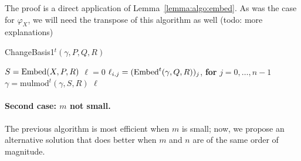 \documentclass[12pt]{article}
\def\mulmod {\ensuremath{\mathrm{mulmod}}}
\begin{document}
The proof is a direct application of Lemma~\ref{lemma:algo:embed}.  As
was the case for $\varphi_X$, we will need the transpose of this
algorithm as well (todo: more explanations)
\begin{algorithm}[H]
  \caption{ChangeBasis1$^t(\gamma,P,Q,R)$}
  \begin{algorithmic}[1]
    \STATE $S={\rm Embed}(X,P,R)$
    \STATE $\ell=0$
    \STATE $\ell_{i,j} = ({\rm Embed}^t(\gamma,Q,R))_j$, {\bf for} $j=0,\dots,n-1$
    \STATE $\gamma = \mulmod^t(\gamma,S,R)$
    \ENDFOR
    \RETURN $\ell$
  \end{algorithmic}
  \label{algo:tiso1}
\end{algorithm}

\paragraph{Second case: $m$ not small.}
The previous algorithm is most efficient when $m$ is small; now, we
propose an alternative solution that does better when $m$ and $n$ are
of the same order of magnitude. 
\end{document}
